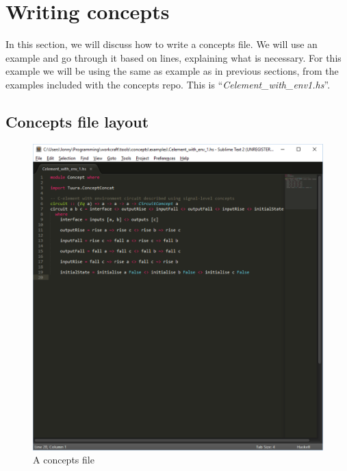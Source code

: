 \documentclass{proc}
\begin{document}
\section{Writing concepts \label{sec:concepts_layout}}

In this section, we will discuss how to write a concepts file. 
We will use an example and go through it based on lines, explaining what is necessary. For this example we will be using the same 
as example as in previous sections, from the examples included with the concepts repo. This is ``\emph{Celement\_with\_env1.hs}''.

\subsection{Concepts file layout}

\begin{figure}[H]
\begin{centering}
\includegraphics[scale=0.6]{images/concepts_file_screenshot}
\par\end{centering}

\begin{centering}
\protect\caption{\label{fig:concepts_file}A concepts file}

\par\end{centering}

\end{figure}
\end{document}
